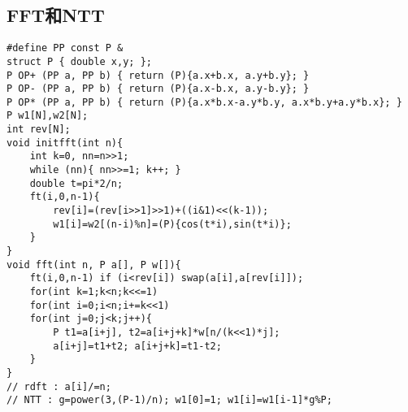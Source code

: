 \documentclass{article}
\begin{document}
\subsection{FFT和NTT}
\begin{lstlisting}
#define PP const P &
struct P { double x,y; };
P OP+ (PP a, PP b) { return (P){a.x+b.x, a.y+b.y}; }
P OP- (PP a, PP b) { return (P){a.x-b.x, a.y-b.y}; }
P OP* (PP a, PP b) { return (P){a.x*b.x-a.y*b.y, a.x*b.y+a.y*b.x}; }
P w1[N],w2[N];
int rev[N];
void initfft(int n){
	int k=0, nn=n>>1;
	while (nn){ nn>>=1; k++; }
	double t=pi*2/n;
	ft(i,0,n-1){
		rev[i]=(rev[i>>1]>>1)+((i&1)<<(k-1));
		w1[i]=w2[(n-i)%n]=(P){cos(t*i),sin(t*i)};
	}
}
void fft(int n, P a[], P w[]){
	ft(i,0,n-1) if (i<rev[i]) swap(a[i],a[rev[i]]);
	for(int k=1;k<n;k<<=1)
	for(int i=0;i<n;i+=k<<1)
	for(int j=0;j<k;j++){
		P t1=a[i+j], t2=a[i+j+k]*w[n/(k<<1)*j];
		a[i+j]=t1+t2; a[i+j+k]=t1-t2;
	}
}
// rdft : a[i]/=n;
// NTT : g=power(3,(P-1)/n); w1[0]=1; w1[i]=w1[i-1]*g%P;
\end{lstlisting}
\end{document}
